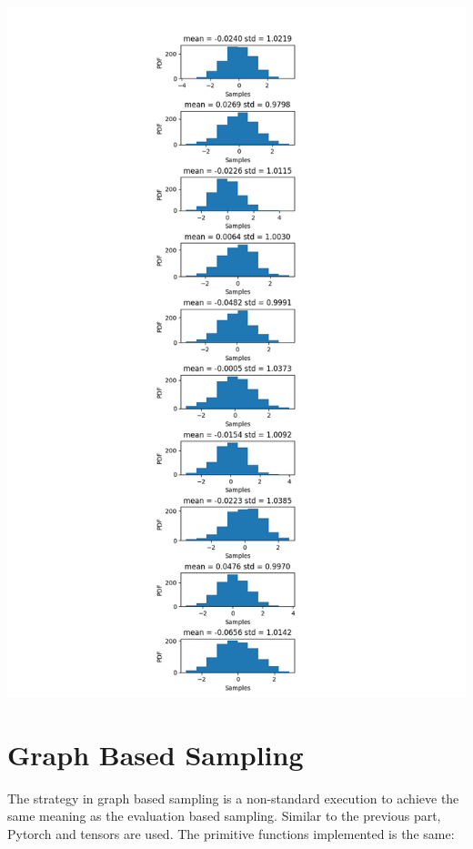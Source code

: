 \documentclass[]{article}
\begin{document}
	\begin{center}
		\includegraphics[height=.8\textheight]{Eval/b1_nn.png}
	\end{center}



\section{Graph Based Sampling}
The strategy in graph based sampling is a non-standard execution to achieve the same meaning as the evaluation based sampling. Similar to the previous part, Pytorch and tensors are used. The primitive functions implemented is the same:
\end{document}
